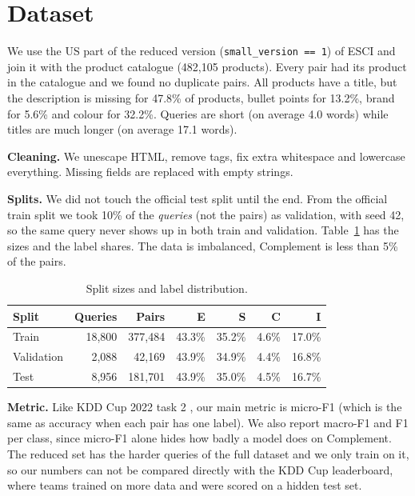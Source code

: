 \documentclass[11pt]{article}
\begin{document}
\section{Dataset}
We use the US part of the reduced version (\texttt{small\_version == 1}) of ESCI \cite{reddy2022} and join it with the product catalogue (482{,}105 products).
Every pair had its product in the catalogue and we found no duplicate pairs.
All products have a title, but the description is missing for 47.8\% of products, bullet points for 13.2\%, brand for 5.6\% and colour for 32.2\%.
Queries are short (on average 4.0 words) while titles are much longer (on average 17.1 words).

\textbf{Cleaning.} We unescape HTML, remove tags, fix extra whitespace and lowercase everything. Missing fields are replaced with empty strings.

\textbf{Splits.} We did not touch the official test split until the end. From the official train split we took 10\% of the \emph{queries} (not the pairs) as validation, with seed 42, so the same query never shows up in both train and validation.
Table~\ref{tab:data} has the sizes and the label shares. The data is imbalanced, Complement is less than 5\% of the pairs.

\begin{table}[H]\centering\small
\begin{tabular}{lrrrrrr}\toprule
Split & Queries & Pairs & E & S & C & I \\\midrule
Train & 18{,}800 & 377{,}484 & 43.3\% & 35.2\% & 4.6\% & 17.0\% \\
Validation & 2{,}088 & 42{,}169 & 43.9\% & 34.9\% & 4.4\% & 16.8\% \\
Test & 8{,}956 & 181{,}701 & 43.9\% & 35.0\% & 4.5\% & 16.7\% \\
\bottomrule\end{tabular}
\caption{Split sizes and label distribution.}\label{tab:data}
\end{table}

\textbf{Metric.} Like KDD Cup 2022 task 2 \cite{reddy2022}, our main metric is micro-F1 (which is the same as accuracy when each pair has one label). We also report macro-F1 and F1 per class, since micro-F1 alone hides how badly a model does on Complement.
The reduced set has the harder queries of the full dataset \cite{reddy2022} and we only train on it, so our numbers can not be compared directly with the KDD Cup leaderboard, where teams trained on more data and were scored on a hidden test set.
\end{document}
